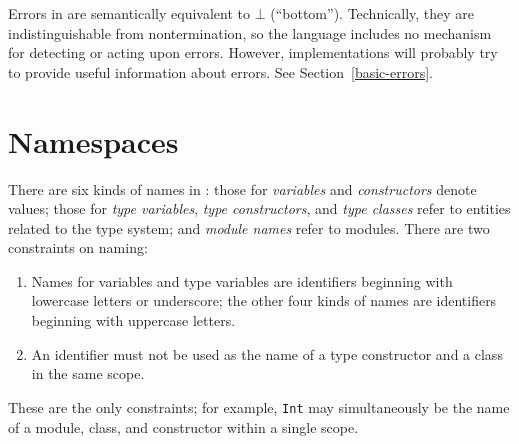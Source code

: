 Errors in \Haskell{} are semantically equivalent to
$\bot$ (``bottom'').  Technically, they are indistinguishable
from nontermination, so the language includes no mechanism
for detecting or acting upon errors.  However, implementations
will probably try to provide useful information about
errors.  See Section~\ref{basic-errors}.


\section{Namespaces}
\label{namespaces}

There are six kinds of names in \Haskell{}: those for {\em variables} and
{\em constructors} denote values; those for {\em type variables}, {\em
type constructors}, and {\em type classes} refer to entities related
to the type system; and {\em module names} refer to modules.
There are two constraints on naming:\nopagebreak[4]
\begin{enumerate}
\item Names for variables and type variables are identifiers beginning
      with lowercase letters or underscore; the other four kinds of names are
      identifiers beginning with uppercase letters.
\item An identifier must not be used as the name of a type constructor
      and a class in the same scope.
\end{enumerate}
These are the only constraints; for example,
\mbox{\tt Int} may simultaneously be the name of a module, class, and constructor
within a single scope.





